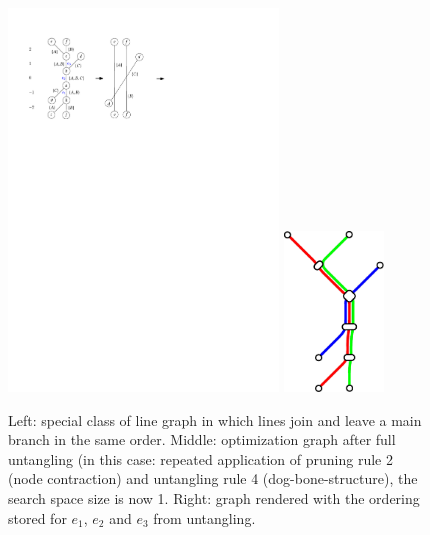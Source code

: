 \documentclass[format=acmsmall, review=false, screen=true]{acmart}
\begin{document}
\begin{figure}
  \centering
  \includegraphics[width=0.64\textwidth,page=1]{untangling/main_leg.pdf}
  \includegraphics[width=0.235\textwidth,page=1]{untangling/bone.pdf}

  \caption{Left: special class of line graph in which lines join and leave a main branch in the same order. Middle: optimization graph after full untangling (in this case: repeated application of pruning rule 2 (node contraction) and untangling rule 4 (dog-bone-structure), the search space size is now 1. Right: graph rendered with the ordering stored for $e_1$, $e_2$ and $e_3$ from untangling.}
  \label{FIG:untangle_main_branch}
\end{figure}

%
\end{document}
